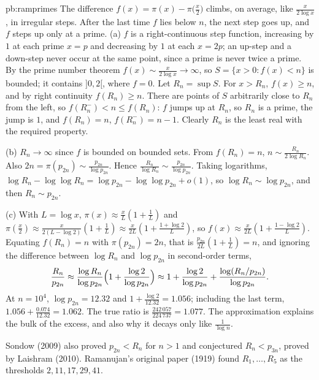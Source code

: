 \begin{solution}{pb:ramprimes}
\idea The difference $f(x)=\pi(x)-\pi\bigl(\frac x2\bigr)$ climbs, on average, like $\frac x{2\log x}$, in irregular steps. After the last time $f$ lies below $n$, the next step goes up, and $f$ steps up only at a prime.
\writeup (a) $f$ is a right-continuous step function, increasing by $1$ at each prime $x=p$ and decreasing by $1$ at each $x=2p$; an up-step and a down-step never occur at the same
point, since a prime is never twice a prime. By the prime number theorem $f(x)\sim\frac x{2\log x}\to\infty$, so $S=\{x>0:f(x)<n\}$ is bounded;
it contains $]0,2[$, where $f=0$. Let $R_n=\sup S$. For $x>R_n$, $f(x)\ge n$, and by right continuity $f(R_n)\ge n$. There are points of $S$ arbitrarily close to $R_n$ from the
left, so $f(R_n^-)<n\le f(R_n)$: $f$ jumps up at $R_n$, so $R_n$ is a prime, the jump is $1$, and $f(R_n)=n$, $f(R_n^-)=n-1$. Clearly $R_n$ is the least real with the required property.

(b) $R_n\to\infty$ since $f$ is bounded on bounded sets. From $f(R_n)=n$, $n\sim\frac{R_n}{2\log R_n}$. Also $2n=\pi(p_{2n})\sim\frac{p_{2n}}{\log p_{2n}}$. Hence
$\frac{R_n}{\log R_n}\sim\frac{p_{2n}}{\log p_{2n}}$. Taking logarithms, $\log R_n-\log\log R_n=\log p_{2n}-\log\log p_{2n}+o(1)$, so $\log R_n\sim\log p_{2n}$, and then
$R_n\sim p_{2n}$.

(c) With $L=\log x$, $\pi(x)\approx\frac xL(1+\frac1L)$ and $\pi(\frac x2)\approx\frac x{2(L-\log2)}(1+\frac1L)\approx\frac x{2L}(1+\frac{1+\log2}L)$, so
$f(x)\approx\frac x{2L}(1+\frac{1-\log2}L)$. Equating $f(R_n)=n$ with $\pi(p_{2n})=2n$, that is $\frac{p_{2n}}{2L}(1+\frac1L)=n$, and ignoring the difference between $\log R_n$ and $\log p_{2n}$
in second-order terms,
\[
\frac{R_n}{p_{2n}}\approx\frac{\log R_n}{\log p_{2n}}\Bigl(1+\frac{\log2}{\log p_{2n}}\Bigr)\approx1+\frac{\log2}{\log p_{2n}}+\frac{\log(R_n/p_{2n})}{\log p_{2n}}.
\]
At $n=10^4$, $\log p_{2n}=12.32$ and $1+\frac{\log2}{12.32}=1.056$; including the last term, $1.056+\frac{0.074}{12.32}=1.062$. The true ratio is $\frac{242\,057}{224\,737}=1.077$. The
approximation explains the bulk of the excess, and also why it decays only like $\frac1{\log n}$.

\leads Sondow (2009) also proved $p_{2n}<R_n$ for $n>1$ and conjectured $R_n<p_{3n}$, proved by Laishram (2010). Ramanujan's original paper (1919) found $R_1,\dots,R_5$ as the thresholds $2,11,17,29,41$.
\end{solution}


